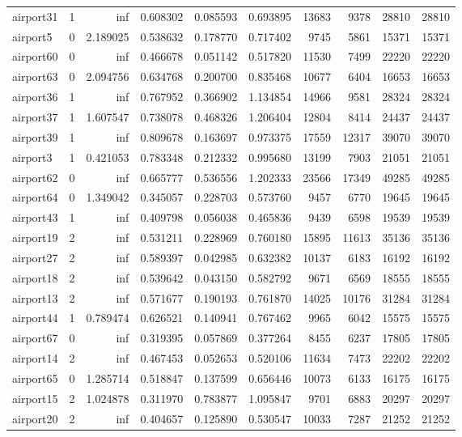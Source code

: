 \begin{longtable}{|l|r|r|r|r|r|r|r|r|r|}
airport31 & 1 & inf & 0.608302 & 0.085593 & 0.693895 & 13683 & 9378 & 28810 & 28810 \\
airport5 & 0 & 2.189025 & 0.538632 & 0.178770 & 0.717402 & 9745 & 5861 & 15371 & 15371 \\
airport60 & 0 & inf & 0.466678 & 0.051142 & 0.517820 & 11530 & 7499 & 22220 & 22220 \\
airport63 & 0 & 2.094756 & 0.634768 & 0.200700 & 0.835468 & 10677 & 6404 & 16653 & 16653 \\
airport36 & 1 & inf & 0.767952 & 0.366902 & 1.134854 & 14966 & 9581 & 28324 & 28324 \\
airport37 & 1 & 1.607547 & 0.738078 & 0.468326 & 1.206404 & 12804 & 8414 & 24437 & 24437 \\
airport39 & 1 & inf & 0.809678 & 0.163697 & 0.973375 & 17559 & 12317 & 39070 & 39070 \\
airport3 & 1 & 0.421053 & 0.783348 & 0.212332 & 0.995680 & 13199 & 7903 & 21051 & 21051 \\
airport62 & 0 & inf & 0.665777 & 0.536556 & 1.202333 & 23566 & 17349 & 49285 & 49285 \\
airport64 & 0 & 1.349042 & 0.345057 & 0.228703 & 0.573760 & 9457 & 6770 & 19645 & 19645 \\
airport43 & 1 & inf & 0.409798 & 0.056038 & 0.465836 & 9439 & 6598 & 19539 & 19539 \\
airport19 & 2 & inf & 0.531211 & 0.228969 & 0.760180 & 15895 & 11613 & 35136 & 35136 \\
airport27 & 2 & inf & 0.589397 & 0.042985 & 0.632382 & 10137 & 6183 & 16192 & 16192 \\
airport18 & 2 & inf & 0.539642 & 0.043150 & 0.582792 & 9671 & 6569 & 18555 & 18555 \\
airport13 & 2 & inf & 0.571677 & 0.190193 & 0.761870 & 14025 & 10176 & 31284 & 31284 \\
airport44 & 1 & 0.789474 & 0.626521 & 0.140941 & 0.767462 & 9965 & 6042 & 15575 & 15575 \\
airport67 & 0 & inf & 0.319395 & 0.057869 & 0.377264 & 8455 & 6237 & 17805 & 17805 \\
airport14 & 2 & inf & 0.467453 & 0.052653 & 0.520106 & 11634 & 7473 & 22202 & 22202 \\
airport65 & 0 & 1.285714 & 0.518847 & 0.137599 & 0.656446 & 10073 & 6133 & 16175 & 16175 \\
airport15 & 2 & 1.024878 & 0.311970 & 0.783877 & 1.095847 & 9701 & 6883 & 20297 & 20297 \\
airport20 & 2 & inf & 0.404657 & 0.125890 & 0.530547 & 10033 & 7287 & 21252 & 21252 \\

\end{longtable}
